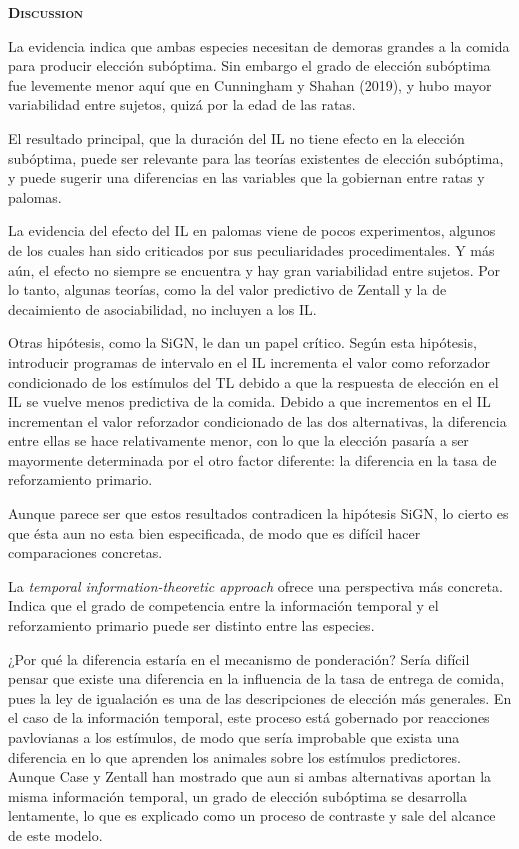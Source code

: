 \documentclass[a4paper,12pt]{article}
\begin{document}
{\scshape\bfseries Discussion}

La evidencia indica que ambas especies necesitan de demoras grandes a la comida para producir elección subóptima. Sin embargo el grado de elección subóptima fue levemente menor aquí que en Cunningham y Shahan (2019), y hubo mayor variabilidad entre sujetos, quizá por la edad de las ratas.

El resultado principal, que la duración del IL no tiene efecto en la elección subóptima, puede ser relevante para las teorías existentes de elección subóptima, y puede sugerir una diferencias en las variables que la gobiernan entre ratas y palomas.

La evidencia del efecto del IL en palomas viene de pocos experimentos, algunos de los cuales han sido criticados por sus peculiaridades procedimentales. Y más aún, el efecto no siempre se encuentra y hay gran variabilidad entre sujetos. Por lo tanto, algunas teorías, como la del valor predictivo de Zentall y la de decaimiento de asociabilidad, no incluyen a los IL.

Otras hipótesis, como la SiGN, le dan un papel crítico. Según esta hipótesis, introducir programas de intervalo en el IL incrementa el valor como reforzador condicionado de los estímulos del TL debido a que la respuesta de elección en el IL se vuelve menos predictiva de la comida. Debido a que incrementos en el IL incrementan el valor reforzador condicionado de las dos alternativas, la diferencia entre ellas se hace relativamente menor, con lo que la elección pasaría a ser mayormente determinada por el otro factor diferente: la diferencia en la tasa de reforzamiento primario.

Aunque parece ser que estos resultados contradicen la hipótesis SiGN, lo cierto es que ésta aun no esta bien especificada, de modo que es difícil hacer comparaciones concretas.

La {\itshape temporal information-theoretic approach} ofrece una perspectiva más concreta. Indica que el grado de competencia entre la información temporal y el reforzamiento primario puede ser distinto entre las especies.

¿Por qué la diferencia estaría en el mecanismo de ponderación? Sería difícil pensar que existe una diferencia en la influencia de la tasa de entrega de comida, pues la ley de igualación es una de las descripciones de elección más generales. En el caso de la información temporal, este proceso está gobernado por reacciones pavlovianas a los estímulos, de modo que sería improbable que exista una diferencia en lo que aprenden los animales sobre los estímulos predictores. Aunque Case y Zentall han mostrado que aun si ambas alternativas aportan la misma información temporal, un grado de elección subóptima se desarrolla lentamente, lo que es explicado como un proceso de contraste y sale del alcance de este modelo.
\end{document}
